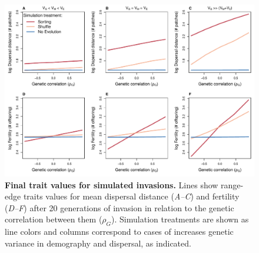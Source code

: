 \documentclass[11pt]{article}
\begin{document}
\newpage{}
\begin{figure}[h!]
\centering
\includegraphics[width=1\linewidth]{Figures/app_fig_traits}
\caption{\textbf{Final trait values for simulated invasions.} Lines show range-edge traits values for mean dispersal distance (\textit{A--C}) and fertility (\textit{D--F}) after 20 generations of invasion in relation to the genetic correlation between them ($\rho_{G}$). Simulation treatments are shown as line colors and columns correspond to cases of increases genetic variance in demography and dispersal, as indicated.}
\label{corr:app_fig_traits}
\end{figure}


\newpage{}


\end{document}
